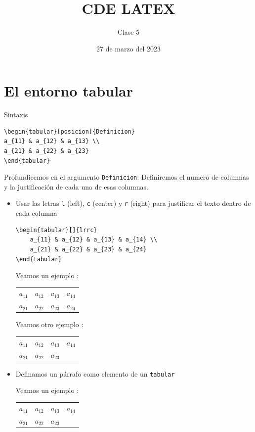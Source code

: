 \documentclass[]{article}
\title{CDE LATEX }
\author{Clase 5}
\date{27 de marzo del 2023}
\begin{document}
\maketitle

\begin{abstract}
	\lipsum[2]
\end{abstract}

\section{El entorno tabular}
\noindent Sintaxis

\begin{verbatim}
\begin{tabular}[posicion]{Definicion}
a_{11} & a_{12} & a_{13} \\
a_{21} & a_{22} & a_{23}
\end{tabular}
\end{verbatim}

Profundicemos en el argumento \verb*|Definicion|:
Definiremos el numero de columnas y la justificación
de cada una de esas columnas.
\begin{itemize}
\item Usar las letras \verb*|l| (left), \verb*|c| (center) y \verb*|r| (right) para justificar el 
texto dentro de cada columna
\begin{verbatim}
\begin{tabular}[]{lrrc}
	a_{11} & a_{12} & a_{13} & a_{14} \\
	a_{21} & a_{22} & a_{23} & a_{24}
\end{tabular}
\end{verbatim}

Veamos un ejemplo :

\begin{tabular}[]{lrrc}
	$a_{11}$ & $a_{12}$ & $a_{13}$ & $a_{14}$ \\
	$a_{21}$ & $a_{22}$ & $a_{23}$ & $a_{24}$
\end{tabular}

Veamos otro ejemplo :

\begin{tabular}[]{lrrc}
	$a_{11}$ & $a_{12}$ & $a_{13}$ & $a_{14}$ \\
	$a_{21}$ & $a_{22}$ & $a_{23}$ & \lipsum[2]
\end{tabular}

\item Definamos un párrafo como elemento de un 
\verb*|tabular|

Veamos un ejemplo :

\begin{tabular}[]{lrrp{9cm}}
	$a_{11}$ & $a_{12}$ & $a_{13}$ & $a_{14}$ \\
	$a_{21}$ & $a_{22}$ & $a_{23}$ & \lipsum[2]
\end{tabular}
\end{itemize}
\end{document}
